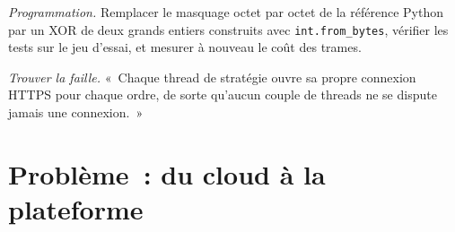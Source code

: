 \begin{exercise}[$\star\star\star$]\label{exo:ll:websocket-rest-tls-and-json-at-speed:7}
\emph{Programmation.} Remplacer le masquage octet par octet de la référence Python par un XOR de deux grands entiers construits avec
\texttt{int.from\_bytes}, vérifier les tests sur le jeu d'essai, et mesurer à nouveau le coût des trames.
\end{exercise}

\begin{exercise}[$\star\star\star$]\label{exo:ll:websocket-rest-tls-and-json-at-speed:8}
\emph{Trouver la faille.} «~Chaque thread de stratégie ouvre sa propre connexion HTTPS pour chaque ordre, de sorte qu'aucun couple de threads
ne se dispute jamais une connexion.~»
\end{exercise}

\section{Problème~: du cloud à la plateforme}

